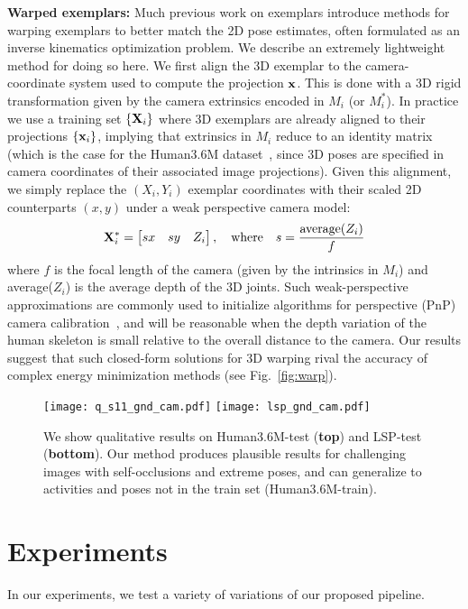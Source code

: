 \documentclass[10pt,twocolumn,letterpaper]{article}
\begin{document}
{\bf Warped exemplars:} Much previous work on exemplars introduce methods for warping exemplars to better match the 2D pose estimates, often formulated as an inverse kinematics optimization problem. We describe an extremely lightweight method for doing so here. We first align the 3D exemplar to the camera-coordinate system used to compute the projection ${\bf x}$. This is done with a 3D rigid transformation given by the camera extrinsics encoded in $M_i$ (or $M^*_i$). In practice we use a training set $\{{\bf X}_i\}$ where 3D exemplars are already aligned to their projections $\{{\bf x}_i\}$, implying that extrinsics in $M_i$ reduce to an identity matrix (which is the case for the Human3.6M dataset~\cite{h36m_pami}, since 3D poses are specified in camera coordinates of their associated image projections). Given this alignment, we simply replace the $(X_i,Y_i)$ exemplar coordinates with their scaled 2D counterparts $(x,y)$ under a weak perspective camera model: \begin{align}
    {\bf X}_i^* = \begin{bmatrix} sx & sy & Z_i \end{bmatrix}, \quad \text{where}\quad  s = \frac{\text{average}(Z_i)}{f} \label{eq:warp}
\end{align}
\noindent where $f$ is the focal length of the camera (given by the intrinsics in $M_i$) and average($Z_i$) is the average depth of the 3D joints. Such weak-perspective approximations are commonly used to initialize algorithms for perspective (PnP) camera calibration~\cite{lu2000fast}, and will be reasonable when the depth variation of the human skeleton is small relative to the overall distance to the camera.  Our results suggest that such closed-form solutions for 3D warping rival the accuracy of complex energy minimization methods (see Fig.~\ref{fig:warp}).



\begin{figure*}[t!]
\texttt{[image: q\_s11\_gnd\_cam.pdf]}
\texttt{[image: lsp\_gnd\_cam.pdf]}
   \caption{We show qualitative results on Human3.6M-test ({\bf top}) and LSP-test ({\bf bottom}). Our method produces plausible results for challenging images with self-occlusions and extreme poses, and can generalize to activities and poses not in the train set (Human3.6M-train).}
\label{fig:qualitative}
\end{figure*}

\section{Experiments} \label{exp}
In our experiments, we test a variety of variations of our proposed pipeline.
\end{document}
